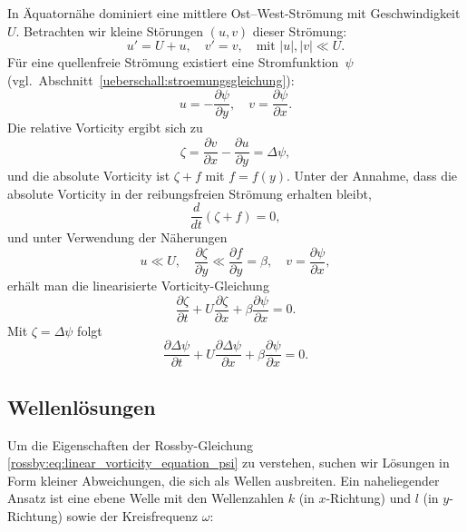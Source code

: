In Äquatornähe dominiert eine mittlere Ost–West-Strömung mit Geschwindigkeit
\(U\). Betrachten wir kleine Störungen \((u,v)\) dieser Strömung:
\begin{equation}
	u' = U + u, \quad v' = v, \quad \text{mit } |u|, |v| \ll U.
	\label{rossby:eq:perturbation}
\end{equation}
Für eine quellenfreie Strömung existiert eine Stromfunktion~$\psi$ (vgl.~Abschnitt~\ref{ueberschall:stroemungsgleichung}):
\begin{equation}
	u = -\frac{\partial \psi}{\partial y}, \quad v = \frac{\partial \psi}{\partial x}.
	\label{rossby:eq:stream_function}
\end{equation}
Die relative Vorticity ergibt sich zu
\begin{equation}
	\zeta = \frac{\partial v}{\partial x} - \frac{\partial u}{\partial y} = \Delta \psi,
	\label{rossby:eq:relative_vorticity}
\end{equation}
und die absolute Vorticity ist \(\zeta + f\) mit \(f = f(y)\). Unter der Annahme, dass die absolute Vorticity in der reibungsfreien Strömung erhalten bleibt,
\begin{equation}
	\frac{d}{dt} (\zeta + f) = 0,
	\label{rossby:eq:absolute_vorticity_conservation}
\end{equation}
und unter Verwendung der Näherungen
\[
	u \ll U, \quad \frac{\partial \zeta}{\partial y} \ll \frac{\partial f}{\partial y} = \beta, \quad v = \frac{\partial \psi}{\partial x},
\]
erhält man die linearisierte Vorticity-Gleichung
\begin{equation}
	\frac{\partial \zeta}{\partial t} + U \frac{\partial \zeta}{\partial x} + \beta \frac{\partial \psi}{\partial x} = 0.
	\label{rossby:eq:linear_vorticity_equation}
\end{equation}
Mit \(\zeta = \Delta \psi\) folgt
\begin{equation}
	\frac{\partial \Delta \psi}{\partial t} + U \frac{\partial \Delta \psi}{\partial x} + \beta \frac{\partial \psi}{\partial x} = 0.
	\label{rossby:eq:linear_vorticity_equation_psi}
\end{equation}

\subsection{Wellenlösungen\label{subsection:rossby:loesungen}}

Um die Eigenschaften der Rossby-Gleichung \eqref{rossby:eq:linear_vorticity_equation_psi}
zu verstehen, suchen wir Lösungen in Form kleiner Abweichungen,
die sich als Wellen ausbreiten. Ein naheliegender Ansatz ist eine
ebene Welle mit den Wellenzahlen $k$ (in $x$-Richtung) und $l$
(in $y$-Richtung) sowie der Kreisfrequenz $\omega$:

